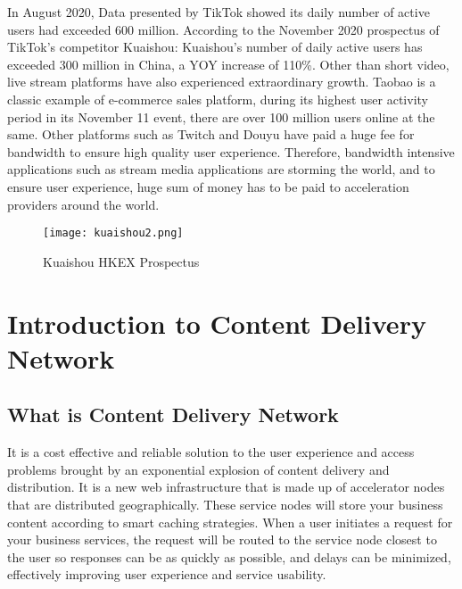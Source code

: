 \documentclass[12pt, a4paper, unicode]{report}
\renewcommand{\epigraphflush}{flushleft}
\begin{document}
    In August 2020, Data presented by TikTok showed its daily number of active users had exceeded 600 million. According to the November 2020 prospectus of TikTok's competitor Kuaishou: Kuaishou's number of daily active users has exceeded 300 million in China, a YOY increase of 110\%. Other than short video, live stream platforms have also experienced extraordinary growth. Taobao is a classic example of e-commerce sales platform, during its highest user activity period in its November 11 event, there are over 100 million users online at the same. Other platforms such as Twitch and Douyu have paid a huge fee for bandwidth to ensure high quality user experience. Therefore, bandwidth intensive applications such as stream media applications are storming the world, and to ensure user experience, huge sum of money has to be paid to acceleration providers around the world.

    \begin{figure}[ht]
    \centering
    \texttt{[image: kuaishou2.png]}
    \caption{Kuaishou HKEX Prospectus}
    \label{fig:kuaishou}
    \end{figure}


    
    \chapter{Introduction to Content Delivery Network}


    
    
    \section{What is Content Delivery Network}
        It is a cost effective and reliable solution to the user experience and access problems brought by an exponential explosion of content delivery and distribution. It is a new web infrastructure that is made up of accelerator nodes that are distributed geographically. These service nodes will store your business content according to smart caching strategies. When a user initiates a request for your business services, the request will be routed to the service node closest to the user so responses can be as quickly as possible, and delays can be minimized, effectively improving user experience and service usability.
\end{document}
